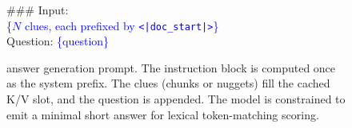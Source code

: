 \begin{figure}[t]
{{\#\#\# Input:\\
\textcolor{blue}{\{\(N\) clues, each prefixed by \texttt{<|doc\_start|>}\}}\\
Question: \textcolor{blue}{\{question\}}
}}
\caption{
\baseLLM{} answer generation prompt. 
The instruction block is computed once as the system prefix. 
The clues (chunks or nuggets) fill the cached K/V slot, and the question is appended. 
The model is constrained to emit a minimal short answer for lexical token-matching scoring.}
\label{fig:generation_prompt}
\end{figure}
